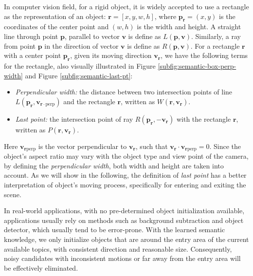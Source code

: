     In computer vision field, for a rigid object, it is widely accepted to use a rectangle as the representation of an object: $\bm{r} = [x, y, w, h]$, where $\bm{p_r}=(x, y)$ is the coordinates of the center point and $(w, h)$ is the width and height.
    A straight line through point $\bm{p}$, parallel to vector $\bm{v}$ is define as $L(\bm{p}, \bm{v})$. Similarly, a ray from point $\bm{p}$ in the direction of vector $\bm{v}$ is define as $R(\bm{p}, \bm{v})$.
    For a rectangle $\bm{r}$ with a center point $\bm{p_r}$, given its moving direction $\bm{v_r}$, we have the following terms for the rectangle, also visually illustrated in Figure \ref{subfig:semantic-box-perp-width} and Figure \ref{subfig:semantic-last-pt}:  
    \begin{itemize}
        \item \emph{Perpendicular width:} the distance between two intersection points of line $L(\bm{p_r}, \bm{v}_{\bm{r}\cdot\text{perp}})$ and the rectangle $\bm{r}$, written as $W(\bm{r}, \bm{v_r})$. 
        \item \emph{Last point:} the intersection point of ray $R(\bm{p_r}, \bm{-v_r})$ with the rectangle $\bm{r}$, written as $P(\bm{r}, \bm{v_r})$.
    \end{itemize}
    Here $\bm{v}_{\bm{r}\text{perp}}$ is the vector perpendicular to $\bm{v_r}$, such that $\bm{v_r}\cdot\bm{v}_{\bm{r}\text{perp}}=0$. Since the object's aspect ratio may vary with the object type and view point of the camera, by defining the \emph{perpendicular width}, both width and height are taken into account. As we will show in the following, the definition of \emph{last point} has a better interpretation of object's moving process, specifically for entering and exiting the scene.

    

    In real-world applications, with no pre-determined object initialization available, applications usually rely on methods such as background subtraction and object detector, which usually tend to be error-prone.
    With the learned semantic knowledge, we only initialize objects that are around the entry area of the current available topics, with consistent direction and reasonable size. Consequently, noisy candidates with inconsistent motions or far away from the entry area will be effectively eliminated. 

